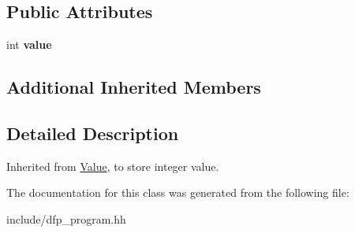 \subsection*{Public Attributes}
\begin{DoxyCompactItemize}
\item 
int {\bfseries value}\hypertarget{class_d_f_p_1_1_int_value_a8fefd55ca349be95500b1636f5f83144}{}\label{class_d_f_p_1_1_int_value_a8fefd55ca349be95500b1636f5f83144}

\end{DoxyCompactItemize}
\subsection*{Additional Inherited Members}


\subsection{Detailed Description}
Inherited from \hyperlink{class_d_f_p_1_1_value}{Value}, to store integer value. 

The documentation for this class was generated from the following file\+:\begin{DoxyCompactItemize}
\item 
include/dfp\+\_\+program.\+hh\end{DoxyCompactItemize}
